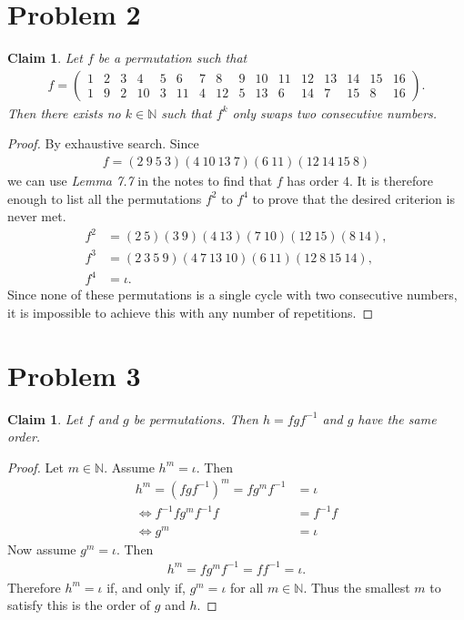 \documentclass{article}
\newcommand{\N}{\mathbb{N}}
\newtheorem{claim}[section]{Claim}
\begin{document}
\section*{Problem 2}
\begin{claim}
  Let $f$ be a permutation such that
  \begin{align*}
    f=\begin{pmatrix}
      1&2&3&4&5&6&7&8&9&10&11&12&13&14&15&16\\
      1&9&2&10&3&11&4&12&5&13&6&14&7&15&8&16
    \end{pmatrix}.
  \end{align*}
  Then there exists no $k\in\N$ such that $f^k$ only swaps two consecutive numbers.
\end{claim}
\begin{proof}
  By exhaustive search. Since
  \begin{align*}
    f = (2\:9\:5\:3)(4\:10\:13\:7)(6\:11)(12\:14\:15\:8)
  \end{align*}
  we can use \emph{Lemma 7.7} in the notes to find that $f$ has order $4$.
  It is therefore enough to list all the permutations $f^2$ to $f^4$ to prove that the desired criterion is never met.
  \begin{align*}
    f^2&=(2\:5)(3\:9)(4\:13)(7\:10)(12\:15)(8\:14),\\
    f^3&=(2\:3\:5\:9)(4\:7\:13\:10)(6\:11)(12\:8\:15\:14),\\
    f^4&=\iota.
  \end{align*}
  Since none of these permutations is a single cycle with two consecutive numbers, it is impossible to achieve this with any number of repetitions.
\end{proof}
\section*{Problem 3}
\begin{claim}
  Let $f$ and $g$ be permutations. Then $h=fgf^{-1}$ and $g$ have the same order.
\end{claim}
\begin{proof}
  Let $m\in\N$. Assume $h^m=\iota$. Then
  \begin{align*}
    h^m = (fgf^{-1})^m= f g^m f^{-1}&=\iota\\
    \Leftrightarrow f^{-1}f g^m f^{-1}f&=f^{-1}f\\
    \Leftrightarrow g^m&=\iota
  \end{align*}
  Now assume $g^m=\iota$. Then
  \begin{align*}
    h^m=f g^m f^{-1}=ff^{-1}=\iota.
  \end{align*}
  Therefore $h^m=\iota$ if, and only if, $g^m=\iota$ for all $m\in\N$.
  Thus the smallest $m$ to satisfy this is the order of $g$ and $h$.
\end{proof}
\end{document}
